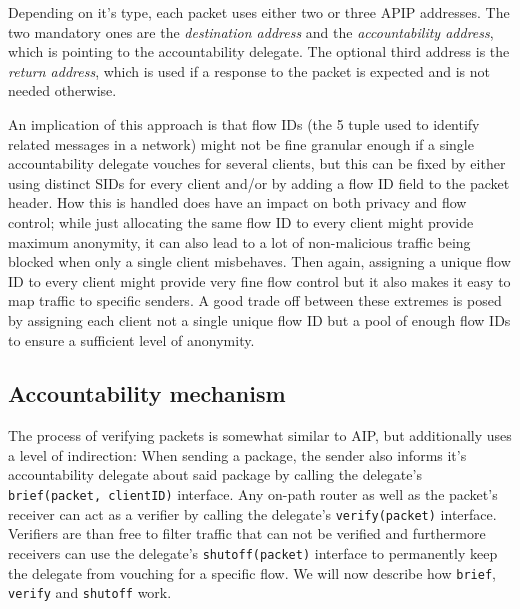\documentclass{acm_proc_article-sp}
\begin{document}
Depending on it's type, each packet uses either two or three APIP addresses. The two mandatory ones are the \emph{destination address} and the \emph{accountability address}, which is pointing to the accountability delegate. The optional third address is the \emph{return address}, which is used if a response to the packet is expected and is not needed otherwise.

An implication of this approach is that flow IDs (the 5 tuple used to identify related messages in a network) might not be fine granular enough if a single accountability delegate vouches for several clients, but this can be fixed by either using distinct SIDs for every client and/or by adding a flow ID field to the packet header. How this is handled does have an impact on both privacy and flow control; while just allocating the same flow ID to every client might provide maximum anonymity, it can also lead to a lot of non-malicious traffic being blocked when only a single client misbehaves. Then again, assigning a unique flow ID to every client might provide very fine flow control but it also makes it easy to map traffic to specific senders. A good trade off between these extremes is posed by assigning each client not a single unique flow ID but a pool of enough flow IDs to ensure a sufficient level of anonymity. 

\subsection{Accountability mechanism}

The process of verifying packets is somewhat similar to AIP, but additionally uses a level of indirection: When sending a package, the sender also informs it's accountability delegate about said package by calling the delegate's \texttt{brief(packet, clientID)} interface. Any on-path router as well as the packet's receiver can act as a verifier by calling the delegate's \texttt{verify(packet)} interface. Verifiers are than free to filter traffic that can not be verified and furthermore receivers can use the delegate's \texttt{shutoff(packet)} interface to permanently keep the delegate from vouching for a specific flow. We will now describe how \texttt{brief}, \texttt{verify} and \texttt{shutoff} work.
\end{document}
